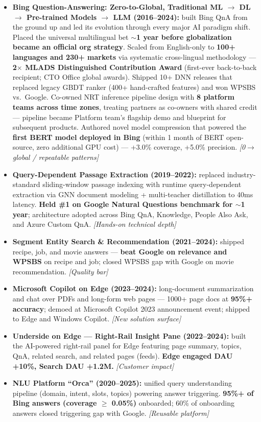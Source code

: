 \documentclass[10.5pt,letterpaper]{article}
\newcommand{\lp}[1]{\textcolor{blue!55!black}{\small\textit{[#1]}}}
\begin{document}
\begin{itemize}
  \item \textbf{Bing Question-Answering: Zero-to-Global, Traditional ML $\to$ DL $\to$ Pre-trained Models $\to$ LLM (2016--2024):} built Bing QnA from the ground up and led its evolution through every major AI paradigm shift. Placed the universal multilingual bet \textbf{$\sim$1 year before globalization became an official org strategy}. Scaled from English-only to \textbf{100+ languages and 230+ markets} via systematic cross-lingual methodology — \textbf{2$\times$ MLADS Distinguished Contribution Award} (first-ever back-to-back recipient; CTO Office global awards). Shipped 10+ DNN releases that replaced legacy GBDT ranker (400+ hand-crafted features) and won WPSBS vs.\ Google. Co-owned NRT inference pipeline design with \textbf{8 platform teams across time zones}, treating partners as co-owners with shared credit — pipeline became Platform team's flagship demo and blueprint for subsequent products. Authored novel model compression that powered the \textbf{first BERT model deployed in Bing} (within 1 month of BERT open-source, zero additional GPU cost) — +3.0\% coverage, +5.0\% precision. \lp{0$\to$global / repeatable patterns}
  \item \textbf{Query-Dependent Passage Extraction (2019--2022):} replaced industry-standard sliding-window passage indexing with runtime query-dependent extraction via GNN document modeling + multi-teacher distillation to 40ms latency. \textbf{Held \#1 on Google Natural Questions benchmark for $\sim$1 year}; architecture adopted across Bing QnA, Knowledge, People Also Ask, and Azure Custom QnA. \lp{Hands-on technical depth}
  \item \textbf{Segment Entity Search \& Recommendation (2021--2024):} shipped recipe, job, and movie answers — \textbf{beat Google on relevance and WPSBS} on recipe and job; closed WPSBS gap with Google on movie recommendation. \lp{Quality bar}
  \item \textbf{Microsoft Copilot on Edge (2023--2024):} long-document summarization and chat over PDFs and long-form web pages — 1000+ page docs at \textbf{95\%+ accuracy}; demoed at Microsoft Copilot 2023 announcement event; shipped to Edge and Windows Copilot. \lp{New solution surface}
  \item \textbf{Underside on Edge --- Right-Rail Insight Pane (2022--2024):} built the AI-powered right-rail panel for Edge featuring page summary, topics, QnA, related search, and related pages (feeds). \textbf{Edge engaged DAU +10\%, Search DAU +1.2M.} \lp{Customer impact}
  \item \textbf{NLU Platform ``Orca'' (2020--2025):} unified query understanding pipeline (domain, intent, slots, topics) powering answer triggering. \textbf{95\%+ of Bing answers (coverage $\ge$ 0.05\%)} onboarded; 60\% of onboarding answers closed triggering gap with Google. \lp{Reusable platform}
\end{itemize}
\end{document}
